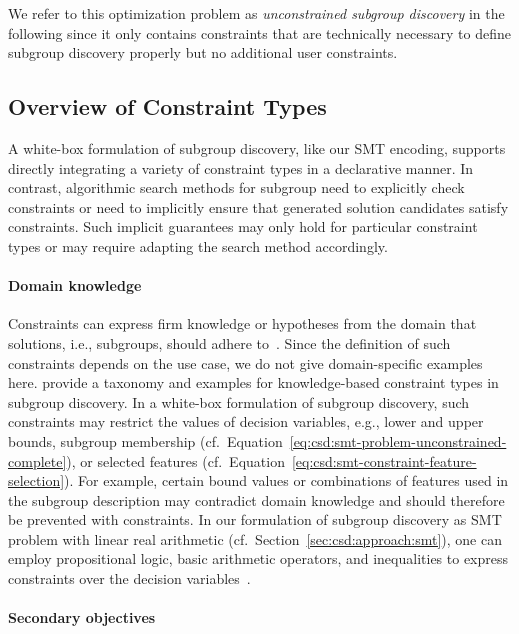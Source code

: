 \documentclass{article}
\theoremstyle{definition}
\begin{document}
We refer to this optimization problem as \emph{unconstrained subgroup discovery} in the following since it only contains constraints that are technically necessary to define subgroup discovery properly but no additional user constraints.

\subsection{Overview of Constraint Types}
\label{sec:csd:approach:constraint-types}

A white-box formulation of subgroup discovery, like our SMT encoding, supports directly integrating a variety of constraint types in a declarative manner.
In contrast, algorithmic search methods for subgroup need to explicitly check constraints or need to implicitly ensure that generated solution candidates satisfy constraints.
Such implicit guarantees may only hold for particular constraint types or may require adapting the search method accordingly.

\paragraph{Domain knowledge}

Constraints can express firm knowledge or hypotheses from the domain that solutions, i.e., subgroups, should adhere to~\cite{bach2022empirical}.
Since the definition of such constraints depends on the use case, we do not give domain-specific examples here.
\cite{atzmueller2006methodological, atzmueller2005exploiting, atzmueller2007using} provide a taxonomy and examples for knowledge-based constraint types in subgroup discovery.
In a white-box formulation of subgroup discovery, such constraints may restrict the values of decision variables, e.g., lower and upper bounds, subgroup membership (cf.~Equation~\ref{eq:csd:smt-problem-unconstrained-complete}), or selected features (cf.~Equation~\ref{eq:csd:smt-constraint-feature-selection}).
For example, certain bound values or combinations of features used in the subgroup description may contradict domain knowledge and should therefore be prevented with constraints.
In our formulation of subgroup discovery as SMT problem with linear real arithmetic (cf.~Section~\ref{sec:csd:approach:smt}), one can employ propositional logic, basic arithmetic operators, and inequalities to express constraints over the decision variables~\cite{barrett2018satisfiability}.

\paragraph{Secondary objectives}
\end{document}

